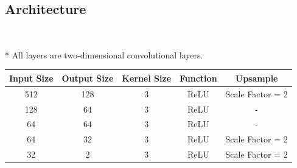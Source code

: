 \documentclass{article}
\begin{document}

\subsection{Architecture}

\

* All layers are two-dimensional convolutional layers.

{\Large
\begin{center}
\begin{tabular}{ |c|c|c|c|c| } 
\hline
Input Size & Output Size & Kernel Size & Function & Upsample \\
\hline
512 & 128 & 3 & ReLU & Scale Factor = 2 \\ 
128 & 64 & 3 & ReLU & - \\ 
64 & 64 & 3 & ReLU &  - \\ 
64 & 32 & 3 & ReLU & Scale Factor = 2 \\ 
32 & 2 & 3 & ReLU & Scale Factor = 2 \\ 

\hline
\end{tabular}
\end{center}
}
\pagebreak
\end{document}
